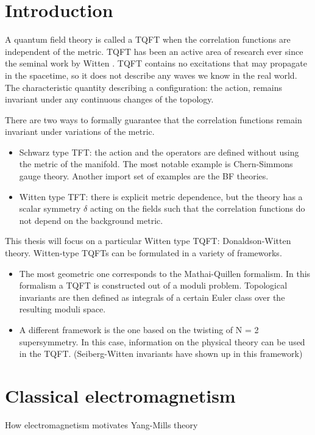 \section{Introduction}

A quantum field theory is called a TQFT when the correlation functions are
independent of the metric. 
TQFT has been an active area of research ever since the seminal work by Witten
\cite{wittenTQFT}. TQFT contains no excitations that may propagate in the
spacetime, so it does not describe any waves we know in the real world. The
characteristic quantity describing a configuration: the action, remains
invariant under any continuous changes of the topology. 

There are two ways to formally guarantee that the correlation functions remain
invariant under variations of the metric. %
\begin{itemize}
	\item Schwarz type TFT: the action and the operators are defined without 
		using the metric of the manifold. The most notable example is
		Chern-Simmons gauge theory. Another import set of examples are the BF
		theories. 
	\item Witten type TFT: there is explicit metric
	dependence, but the theory has a scalar symmetry $\delta$ acting on
	the fields such that the correlation
	functions do not depend on the background metric. 
\end{itemize}

This thesis will focus on a particular Witten type TQFT: Donaldson-Witten
theory. Witten-type TQFTs can be formulated in a variety of frameworks. 
\begin{itemize}
	\item 
 The most geometric one corresponds to the Mathai-Quillen formalism. In this
formalism a TQFT is constructed out of a moduli problem. Topological invariants
are then defined as integrals of a certain Euler class over the resulting moduli
space.\cite{cernTQFT}
	\item 
 A different framework is the one based on the twisting of N = 2 supersymmetry.
In this case, information on the physical theory can be used in the
TQFT. (Seiberg-Witten invariants have shown up in this framework)
\end{itemize}

\section{Classical electromagnetism}
How electromagnetism motivates Yang-Mills theory

